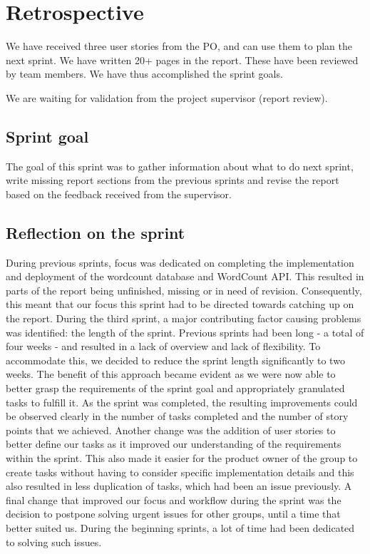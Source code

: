 \section{Retrospective}
We have received three user stories from the PO, and can use them to plan the next sprint.  We have written 20+ pages in the report. These have been reviewed by team members.  We have thus accomplished the sprint goals. 

We are waiting for validation from the project supervisor (report review).

\subsection{Sprint goal}
The goal of this sprint was to gather information about what to do next sprint, write missing report sections from the previous sprints and revise the report based on the feedback received from the supervisor. 

\subsection{Reflection on the sprint}
During previous sprints, focus was dedicated on completing the implementation and deployment of the wordcount database and WordCount API. This resulted in parts of the report being unfinished, missing or in need of revision. Consequently, this meant that our focus this sprint had to be directed towards catching up on the report.
During the third sprint, a major contributing factor causing problems was identified: the length of the sprint. Previous sprints had been long - a total of four weeks - and resulted in a lack of overview and lack of flexibility. To accommodate this, we decided to reduce the sprint length significantly to two weeks. The benefit of this approach became evident as we were now able to better grasp the requirements of the sprint goal and appropriately granulated tasks to fulfill it. As the sprint was completed, the resulting improvements could be observed clearly in the number of tasks completed and the number of story points that we achieved. 
Another change was the addition of user stories to better define our tasks as it improved our understanding of the requirements within the sprint. This also made it easier for the product owner of the group to create tasks without having to consider specific implementation details and this also resulted in less duplication of tasks, which had been an issue previously.
A final change that improved our focus and workflow during the sprint was the decision to postpone solving urgent issues for other groups, until a time that better suited us. During the beginning sprints, a lot of time had been dedicated to solving such issues.

